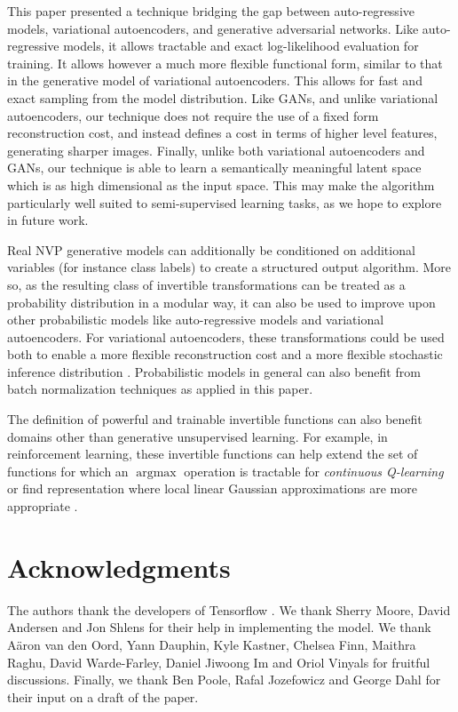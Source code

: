 \documentclass{article}
\DeclareMathOperator*{\argmax}{argmax}
\begin{document}
This paper presented a technique bridging the gap between auto-regressive models, variational autoencoders, and generative adversarial networks. Like auto-regressive models, it allows tractable and exact log-likelihood evaluation for training. It allows however a much more flexible functional form, similar to that in the generative model of variational autoencoders. This allows for fast and exact sampling from the model distribution.
Like GANs, and unlike variational autoencoders, our technique does not require the use of a fixed form reconstruction cost, and instead defines a cost in terms of higher level features, generating sharper images.
Finally, unlike both variational autoencoders and GANs, our technique is able to learn a semantically meaningful latent space which is as high dimensional as the input space. This may make the algorithm particularly well suited to semi-supervised learning tasks, as we hope to explore in future work.

Real NVP generative models can additionally be conditioned on additional variables (for instance class labels) to create a structured output algorithm. More so, as the resulting class of invertible transformations can be treated as a probability distribution in a modular way, it can also be used to improve upon other probabilistic models like auto-regressive models and variational autoencoders. For variational autoencoders, these transformations could be used both to enable a more flexible reconstruction cost  \citep{DBLP:journals/corr/LarsenSW15} and a more flexible stochastic inference distribution \citep{ rezende2015variational}. Probabilistic models in general can also benefit from batch normalization techniques as applied in this paper.

The definition of powerful and trainable invertible functions can also benefit domains other than generative unsupervised learning. For example, in reinforcement learning, these invertible functions can help extend the set of functions for which an $\argmax$ operation is tractable for {\em continuous Q-learning} \citep{gu2016continuous} or find representation where local linear Gaussian approximations are more appropriate \citep{watter2015embed}.



\section{Acknowledgments}
The authors thank the developers of Tensorflow \citep{abadi2016tensorflow}.
We thank Sherry Moore, David Andersen and Jon Shlens for their help in implementing the model.
We thank Aäron van den Oord, Yann Dauphin, Kyle Kastner, Chelsea Finn, Maithra Raghu, David Warde-Farley, Daniel Jiwoong Im and Oriol Vinyals for fruitful discussions.
Finally, we thank Ben Poole, Rafal Jozefowicz and George Dahl for their input on a draft of the paper.
\end{document}

